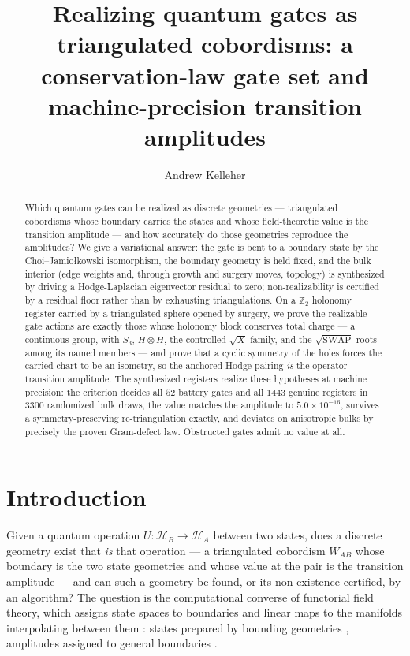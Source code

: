 \documentclass[a4paper,twocolumn,11pt,unpublished]{quantumarticle}
\title{Realizing quantum gates as triangulated cobordisms: a
conservation-law gate set and machine-precision transition amplitudes}
\author{Andrew Kelleher}
\affiliation{Independent researcher}  %
\theoremstyle{plain}
\theoremstyle{remark}
\begin{document}
\maketitle

\begin{abstract}
Which quantum gates can be realized as discrete geometries --- triangulated
cobordisms whose boundary carries the states and whose field-theoretic value
is the transition amplitude --- and how accurately do those geometries
reproduce the amplitudes? We give a variational answer: the gate is bent to
a boundary state by the Choi--Jamio{\l}kowski isomorphism, the boundary
geometry is held fixed, and the bulk interior (edge weights and, through
growth and surgery moves, topology) is synthesized by driving a
Hodge-Laplacian eigenvector residual to zero; non-realizability is certified
by a residual floor rather than by exhausting triangulations. On a
$\mathbb{Z}_2$ holonomy register carried by a triangulated sphere opened by
surgery, we prove the realizable gate actions are exactly those whose
holonomy block conserves total charge --- a continuous group, with $S_3$,
$H\otimes H$, the controlled-$\sqrt{X}$ family, and the
$\sqrt{\mathrm{SWAP}}$ roots among its named members --- and prove that a
cyclic symmetry of the holes forces the carried chart to be an isometry,
so the anchored Hodge pairing \emph{is} the operator transition
amplitude. The synthesized registers realize these hypotheses at machine
precision: the criterion decides all $52$ battery gates and all $1443$
genuine registers in $3300$ randomized bulk draws, the value matches the
amplitude to $5.0\times10^{-16}$, survives a symmetry-preserving
re-triangulation exactly, and deviates on anisotropic bulks by precisely
the proven Gram-defect law. Obstructed gates admit no value at all.
\end{abstract}

\section{Introduction}
\label{sec:intro}

Given a quantum operation $U:\mathcal{H}_B\to\mathcal{H}_A$ between two
states, does a discrete geometry exist that \emph{is} that operation --- a
triangulated cobordism $W_{AB}$ whose boundary is the two state geometries
and whose value at the pair is the transition amplitude --- and can such a
geometry be found, or its non-existence certified, by an algorithm? The
question is the computational converse of functorial field theory, which
assigns state spaces to boundaries and linear maps to the manifolds
interpolating between them \cite{Atiyah1988TQFT,Segal2004Definition}:
states prepared by bounding geometries
\cite{HartleHawking1983WaveFunction}, amplitudes assigned to general
boundaries \cite{Oeckl2003GeneralBoundary}.
\end{document}
